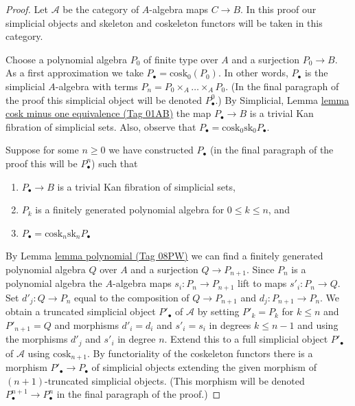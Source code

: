 \documentclass{amsart}
\theoremstyle{plain}
\theoremstyle{definition}
\theoremstyle{remark}
\numberwithin{equation}{subsection}
\begin{document}
\begin{proof}
Let $\mathcal{A}$ be the category of $A$-algebra maps $C \to B$.
In this proof our simplicial objects and skeleton and coskeleton
functors will be taken in this category.

\medskip\noindent
Choose a polynomial algebra $P_0$ of finite type over $A$ and a surjection
$P_0 \to B$. As a first approximation we take
$P_\bullet = \text{cosk}_0(P_0)$. In other words, $P_\bullet$ is the simplicial
$A$-algebra with terms $P_n = P_0 \times_A \ldots \times_A P_0$.
(In the final paragraph of the proof this simplicial object will
be denoted $P^0_\bullet$.) By
Simplicial, Lemma \href{https://stacks.math.columbia.edu/tag/01AB}{lemma cosk minus one equivalence (Tag 01AB)}
the map $P_\bullet \to B$ is a trivial Kan fibration of simplicial sets.
Also, observe that $P_\bullet = \text{cosk}_0 \text{sk}_0 P_\bullet$.

\medskip\noindent
Suppose for some $n \geq 0$ we have constructed $P_\bullet$
(in the final paragraph of the proof this will be $P^n_\bullet$)
such that
\begin{enumerate}
\item[(a)] $P_\bullet \to B$ is a trivial Kan fibration of simplicial sets,
\item[(b)] $P_k$ is a finitely generated polynomial algebra for
$0 \leq k \leq n$, and
\item[(c)] $P_\bullet = \text{cosk}_n \text{sk}_n P_\bullet$
\end{enumerate}
By Lemma \href{https://stacks.math.columbia.edu/tag/08PW}{lemma polynomial (Tag 08PW)}
we can find a finitely generated polynomial algebra $Q$ over $A$
and a surjection $Q \to P_{n + 1}$. Since $P_n$ is a polynomial algebra
the $A$-algebra maps $s_i : P_n \to P_{n + 1}$ lift to maps
$s'_i : P_n \to Q$. Set $d'_j : Q \to P_n$ equal to the composition of
$Q \to P_{n + 1}$ and $d_j : P_{n + 1} \to P_n$.
We obtain a truncated simplicial object $P'_\bullet$ of $\mathcal{A}$
by setting $P'_k = P_k$ for $k \leq n$ and $P'_{n + 1} = Q$ and morphisms
$d'_i = d_i$ and $s'_i = s_i$ in degrees $k \leq n - 1$ and using the
morphisms $d'_j$ and $s'_i$ in degree $n$. Extend this to a full simplicial
object $P'_\bullet$ of $\mathcal{A}$ using $\text{cosk}_{n + 1}$. By
functoriality of the coskeleton functors there is a morphism
$P'_\bullet \to P_\bullet$ of simplicial objects extending the
given morphism of $(n + 1)$-truncated simplicial objects.
(This morphism will be denoted $P^{n + 1}_\bullet \to P^n_\bullet$
in the final paragraph of the proof.)


\end{proof}
\end{document}
